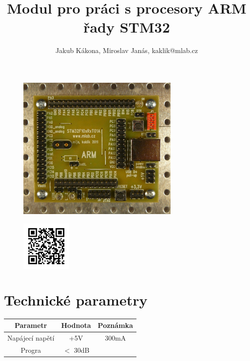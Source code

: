 \documentclass[12pt,a4paper,oneside]{article}
\begin{document}
\title{Modul pro práci s procesory ARM řady STM32}
\author{Jakub Kákona, Miroslav Janás, kaklik@mlab.cz}
\maketitle

\thispagestyle{empty}
\begin{abstract}
\end{abstract}

\begin{figure} [htbp]
\begin{center}
\includegraphics [width=80mm] {./img/STM32F10xRxT_Top_Big.jpg} 
\end{center}
\end{figure}

\begin{figure} [b]
\includegraphics [width=25mm] {./img/STM32F10xRxT_QRcode.png} 
\end{figure}

\newpage
\tableofcontents


\section{Technické parametry}
\begin{table}[htbp]
\begin{center}
\begin{tabular}{|c|c|c|}
\hline
\multicolumn{1}{|c|}{Parametr} & \multicolumn{1}{|c|}{Hodnota} & \multicolumn{1}{|c|}{Poznámka} \\ \hline
Napájecí napětí & +5V &  300mA \\ \hline
Progra  & $<$ 30dB & \\ \hline
\end{tabular}
\end{center}
\end{table}
\end{document}
